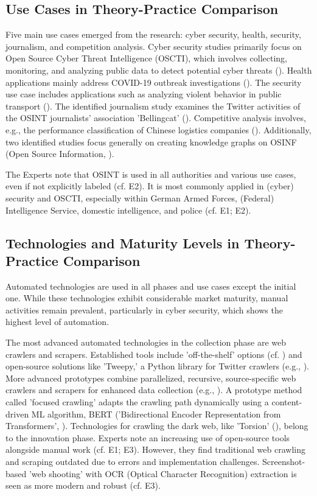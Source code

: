 \documentclass[10pt]{article}
\begin{document}
\subsection{Use Cases in Theory-Practice Comparison}

Five main use cases emerged from the research: cyber security, health, security, journalism,
and competition analysis. Cyber security studies primarily focus on Open Source Cyber Threat
Intelligence (OSCTI), which involves collecting, monitoring, and analyzing public
data to detect potential cyber threats (\cite{Ahuja.2022}).
Health applications mainly address COVID-19 outbreak investigations (\cite{Kpozehouen.2020}).
The security use case includes applications such as
analyzing violent behavior in public transport (\cite{Nobili.2021}). The identified journalism study examines the
Twitter activities of the OSINT journalists' association 'Bellingcat' (\cite{Bar.2023}). Competitive analysis
involves, e.g., the performance classification of Chinese logistics companies (\cite{Tao.2023}).
Additionally, two identified studies focus generally on creating knowledge graphs on OSINF (Open Source Information, \cite{Hu.2023, Ma.2022}).

The Experts note that OSINT is used in all authorities and various use cases, even if not explicitly labeled (cf. E2). It is most commonly applied in (cyber) security and OSCTI, especially within German Armed Forces, (Federal) Intelligence Service, domestic intelligence, and police (cf. E1; E2).

\subsection{Technologies and Maturity Levels in Theory-Practice Comparison} \label{sec:matcomp}

Automated technologies are used in all phases and use cases except the initial one. While these technologies exhibit considerable market maturity, manual activities remain prevalent, particularly in cyber security, which shows the highest level of automation.

The most advanced automated technologies in the collection phase are web crawlers and scrapers. Established tools include 'off-the-shelf' options (cf. \cite{Middleton.2020}) and open-source solutions like 'Tweepy,' a Python library for Twitter crawlers (e.g., \cite{Adewopo.2020}). More advanced prototypes combine parallelized, recursive, source-specific web crawlers and scrapers for enhanced data collection (e.g., \cite{Jenkins.2021}). A prototype method called 'focused crawling' adapts the crawling path dynamically using a content-driven ML algorithm, BERT ('Bidirectional Encoder Representation from Transformers', \cite{Kuehn.2023}). Technologies for crawling the dark web, like 'Torsion' (\cite{Sonawane.2022}), belong to the innovation phase. Experts note an increasing use of open-source tools alongside manual work (cf. E1; E3). However, they find traditional web crawling and scraping outdated due to errors and implementation challenges. Screenshot-based 'web shooting' with OCR (Optical Character Recognition) extraction is seen as more modern and robust (cf. E3).
\end{document}

